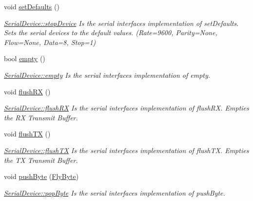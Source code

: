 \begin{DoxyCompactItemize}
void \hyperlink{class_serial_device_a08a8a19f8a25c1dc7593c91afc7d55bd}{set\+Defaults} ()
\begin{DoxyCompactList}\small\item\em \hyperlink{class_serial_device_a55f94898f33ab4674c138fa2cb2e75a1}{Serial\+Device\+::stop\+Device} Is the serial interface\textquotesingle{}s implementation of set\+Defaults. Sets the serial devices to the default values. (Rate=9600, Parity=None, Flow=None, Data=8, Stop=1) \end{DoxyCompactList}\item 
bool \hyperlink{class_serial_device_ae9fc540188704dbdbf3e75d482a92b86}{empty} ()
\begin{DoxyCompactList}\small\item\em \hyperlink{class_serial_device_ae9fc540188704dbdbf3e75d482a92b86}{Serial\+Device\+::empty} Is the serial interface\textquotesingle{}s implementation of empty. \end{DoxyCompactList}\item 
void \hyperlink{class_serial_device_a9ba3e46cf67a9b03e1614afe4c40d78a}{flush\+RX} ()
\begin{DoxyCompactList}\small\item\em \hyperlink{class_serial_device_a9ba3e46cf67a9b03e1614afe4c40d78a}{Serial\+Device\+::flush\+RX} Is the serial interface\textquotesingle{}s implementation of flush\+RX. Empties the RX Transmit Buffer. \end{DoxyCompactList}\item 
void \hyperlink{class_serial_device_a56d7c575161fd216821d06e25f37106c}{flush\+TX} ()
\begin{DoxyCompactList}\small\item\em \hyperlink{class_serial_device_a56d7c575161fd216821d06e25f37106c}{Serial\+Device\+::flush\+TX} Is the serial interface\textquotesingle{}s implementation of flush\+TX. Empties the TX Transmit Buffer. \end{DoxyCompactList}\item 
void \hyperlink{class_serial_device_a8ae456ccffcf8afccdfe49357aed3e06}{push\+Byte} (\hyperlink{conversions_8h_a1f006e31a957accfe6aa1bf6f401efce}{Fly\+Byte})
\begin{DoxyCompactList}\small\item\em \hyperlink{class_serial_device_aa48df17f28ab9f613ba07181487a39c9}{Serial\+Device\+::pop\+Byte} Is the serial interface\textquotesingle{}s implementation of push\+Byte. \end{DoxyCompactList}\item 

\end{DoxyCompactItemize}
